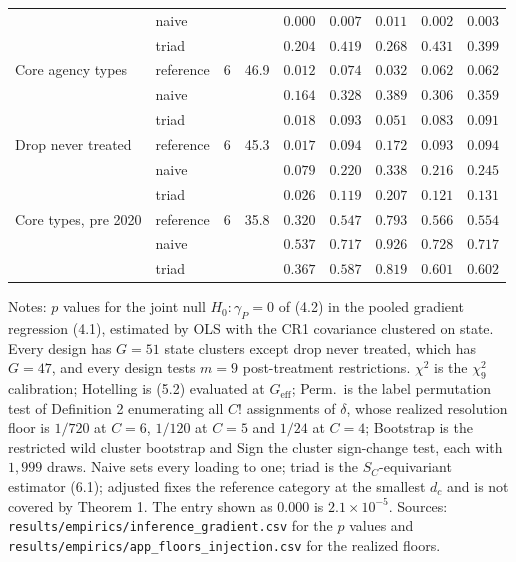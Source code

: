 \documentclass[12pt]{article}
\theoremstyle{definition}
\numberwithin{equation}{section}
\begin{document}
\begin{table}[htbp]
\begin{tabular}{llrrrrrrr}
 & naive &  &  & $0.000$ & $0.007$ & $0.011$ & $0.002$ & $0.003$ \\
 & triad &  &  & $0.204$ & $0.419$ & $0.268$ & $0.431$ & $0.399$ \\
\addlinespace
Core agency types & reference & 6 & 46.9 & $0.012$ & $0.074$ & $0.032$ & $0.062$ & $0.062$ \\
 & naive &  &  & $0.164$ & $0.328$ & $0.389$ & $0.306$ & $0.359$ \\
 & triad &  &  & $0.018$ & $0.093$ & $0.051$ & $0.083$ & $0.091$ \\
\addlinespace
Drop never treated & reference & 6 & 45.3 & $0.017$ & $0.094$ & $0.172$ & $0.093$ & $0.094$ \\
 & naive &  &  & $0.079$ & $0.220$ & $0.338$ & $0.216$ & $0.245$ \\
 & triad &  &  & $0.026$ & $0.119$ & $0.207$ & $0.121$ & $0.131$ \\
\addlinespace
Core types, pre 2020 & reference & 6 & 35.8 & $0.320$ & $0.547$ & $0.793$ & $0.566$ & $0.554$ \\
 & naive &  &  & $0.537$ & $0.717$ & $0.926$ & $0.728$ & $0.717$ \\
 & triad &  &  & $0.367$ & $0.587$ & $0.819$ & $0.601$ & $0.602$ \\
\bottomrule
\end{tabular}

\smallskip
\begin{minipage}{0.95\textwidth}
\footnotesize Notes: $p$ values for the joint null $H_0: \gamma_P = 0$ of
(4.2) in the pooled gradient regression (4.1), estimated
by OLS with the CR1 covariance clustered on state. Every design has $G = 51$
state clusters except drop never treated, which has $G = 47$, and every design
tests $m = 9$ post-treatment restrictions. $\chi^2$ is the $\chi^2_9$
calibration; Hotelling is (5.2) evaluated at $G_{\mathrm{eff}}$;
Perm.\ is the label permutation test of Definition 2 enumerating
all $C!$ assignments of $\delta$, whose realized resolution floor is $1/720$ at
$C = 6$, $1/120$ at $C = 5$ and $1/24$ at $C = 4$; Bootstrap is the restricted
wild cluster bootstrap and Sign the cluster sign-change test, each with
$1{,}999$ draws. Naive sets every loading to one; triad is the
$S_C$-equivariant estimator (6.1); adjusted fixes the reference
category at the smallest $d_c$ and is not covered by Theorem 1.
The entry shown as $0.000$ is $2.1 \times 10^{-5}$. Sources:
\texttt{results/empirics/inference\_gradient.csv} for the $p$ values and
\texttt{results/empirics/app\_floors\_injection.csv} for the realized
floors.
\end{minipage}
\end{table}
\end{document}
